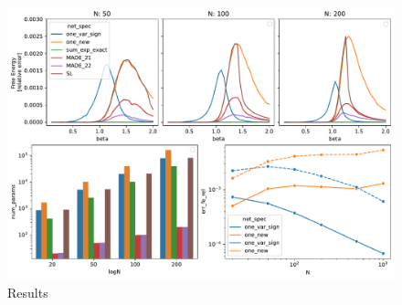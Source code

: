 \documentclass[aps,physrev,10pt,floatfix,longbibliography,nofootinbib,reprint]{revtex4-2}
\begin{document}
\begin{figure}[!h]
    \centering
    \includegraphics[width=1\textwidth]{img/CW_res.pdf}
    \caption{Results}
    \label{fig:curie_weiss}
\end{figure}
\end{document}
